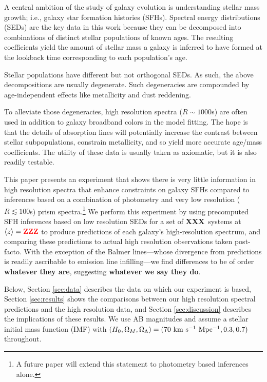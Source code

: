 \documentclass[a4paper,fleqn,usenatbib]{mnras}
\newcommand{\bfr}{\bf\color{red}}
\newcommand{\ntot}{{\bfr XXX}} %
\newcommand{\midz}{{\bfr ZZZ}} %
\begin{document}
A central ambition of the study of galaxy evolution is understanding stellar mass growth; i.e., galaxy
star formation histories (SFHs). Spectral energy distributions (SEDs) are the key data in this work because 
they can be decomposed into combinations of distinct stellar populations of known ages. The resulting 
coefficients yield the amount of stellar mass a galaxy is inferred to have formed at the lookback time 
corresponding to each population's age.

Stellar populations have different but not orthogonal SEDs. As such, the above decompositions are 
usually degenerate. Such degeneracies are compounded by age-independent effects like metallicity and 
dust reddening. 

To alleviate those degeneracies, high resolution spectra ($R\sim1000$s) are often used in addition to 
galaxy broadband colors in the model fitting. The hope is that the details of absorption lines will potentially 
increase the contrast between stellar subpopulations, constrain metallicity, and so yield more accurate 
age/mass coefficients. The utility of these data is usually taken as axiomatic, but it is also readily testable. 

This paper presents an experiment that shows there is very little information in high resolution spectra
that enhance constraints on galaxy SFHs compared to inferences based on a combination of photometry and 
very low resolution ($R\lesssim100$s) prism spectra.\footnote{A future paper will extend this statement 
to photometry based inferences alone.} We perform this experiment by using precomputed SFH inferences
based on low resolution SEDs for a set of \ntot\ systems at $\langle z\rangle=\midz$ to produce predictions 
of each galaxy's high-resolution spectrum, and comparing these predictions to actual high resolution 
observations taken post-facto. With the exception of the Balmer lines---whose divergence from predictions 
is readily ascribable to emission line infilling---we find differences to be of order {\bfr whatever they are}, 
suggesting {\bfr whatever we say they do}.

Below, Section \ref{sec:data} describes the data on which our experiment is based, Section \ref{sec:results} 
shows the comparisons between our high resolution spectral predictions and the high resolution data, and
Section \ref{sec:discussion} describes the implications of these results. We use AB magnitudes and assume 
a \citet{Chabrier03} stellar initial mass function (IMF) with $(H_{0}, \Omega_{M}, \Omega_{\Lambda}) =
(70~{\rm km~s^{-1}~Mpc^{-1}}, 0.3, 0.7)$ throughout.
\end{document}
